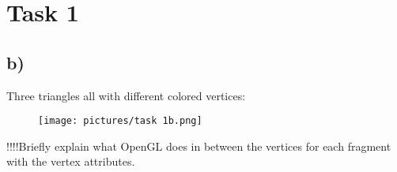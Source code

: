 \section{Task 1}
\subsection{b)}
Three triangles all with different colored vertices:
\begin{figure}[h!]
    \centering
    \texttt{[image: pictures/task 1b.png]}
\end{figure}

!!!!Briefly explain what OpenGL does in between the vertices for each fragment with the vertex attributes.
